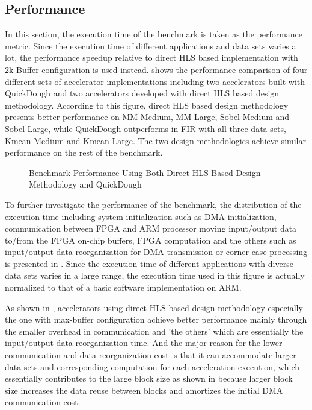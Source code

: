 \subsection{Performance}
In this section, the execution time of the benchmark is taken as the performance metric. Since the execution time of different applications and data sets varies a lot, the performance speedup relative to direct HLS based implementation with 2k-Buffer configuration is used instead.  shows the performance comparison of four different sets of accelerator implementations including two accelerators built with QuickDough and two accelerators developed with direct HLS based design methodology. According to this figure, direct HLS based design methodology presents better performance on MM-Medium, MM-Large, Sobel-Medium and Sobel-Large, while QuickDough outperforms in FIR with all three data sets, Kmean-Medium and Kmean-Large. The two design methodologies achieve similar performance on the rest of the benchmark. 

\begin{figure*}[htpb]
\caption{Benchmark Performance Using Both Direct HLS Based Design Methodology and QuickDough}
\label{fig:real-perf}
\end{figure*}

To further investigate the performance of the benchmark, the distribution of the execution time including system initialization such as DMA initialization, communication between FPGA and ARM processor moving input/output data to/from the FPGA on-chip buffers, FPGA computation and the others such as input/output data reorganization for DMA transmission or corner case processing is presented in . Since the execution time of different applications with diverse data sets varies in a large range, the execution time used in this figure is actually normalized to that of a basic software implementation on ARM. 

As shown in , accelerators using direct HLS based design methodology especially the one with max-buffer configuration achieve better performance mainly through the smaller overhead in communication and 'the others' which are essentially the input/output data reorganization time. And the major reason for the lower communication and data reorganization cost is that it can accommodate larger data sets and corresponding computation for each acceleration execution, which essentially contributes to the large block size as shown in  because larger block size increases the data reuse between blocks and amortizes the initial DMA communication cost.

